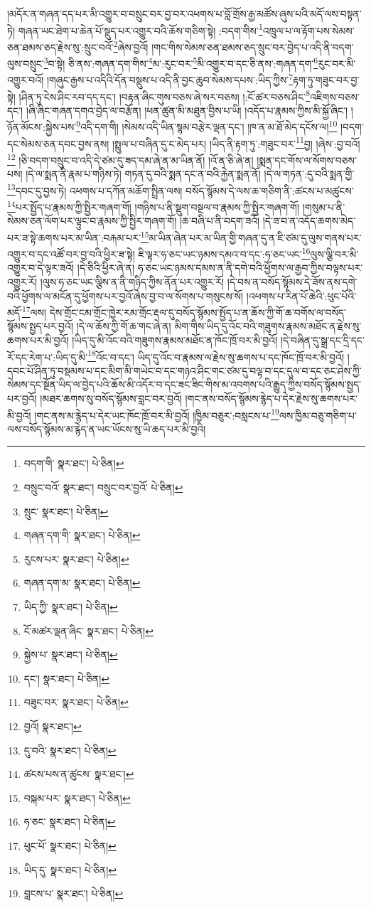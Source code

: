 །མདོར་ན་གཞན་དད་པར་མི་འགྱུར་བ་བསྲུང་བར་བྱ་བར་འཕགས་པ་བློ་གྲོས་རྒྱ་མཚོས་ཞུས་པའི་མདོ་ལས་བསྟན་ཏེ། གཞན་ཡང་ཐེག་པ་ཆེན་པོ་སྡུད་པར་འགྱུར་བའི་ཆོས་གཅིག་སྟེ། :བདག་གིས་\footnote{བདག་གི་  སྣར་ཐང་།  པེ་ཅིན། }འཁྲུལ་པ་ལ་རྟོག་པས་སེམས་ཅན་ཐམས་ཅད་རྗེས་སུ་:སྲུང་བའོ་\footnote{བསྲུང་བའོ་  སྣར་ཐང་། བསྲུང་བར་བྱའོ་  པེ་ཅིན། }ཞེས་བྱའོ། །གང་གིས་སེམས་ཅན་ཐམས་ཅད་སྲུང་བར་བྱེད་པ་འདི་ནི་བདག་ལུས་བསྲུང་\footnote{སྲུང་  སྣར་ཐང་།  པེ་ཅིན། }བ་སྟེ། ཅི་ནས་:གཞན་དག་གིས་\footnote{གཞན་དག་གི་  སྣར་ཐང་།  པེ་ཅིན། }མ་:རུང་བར་\footnote{རུངས་པར་  སྣར་ཐང་།  པེ་ཅིན། }མི་འགྱུར་བ་དང་ཅི་ནས་:གཞན་དག་\footnote{གཞན་དག་མ་  སྣར་ཐང་།  པེ་ཅིན། }རུང་བར་མི་འགྱུར་བའོ། །གཞུང་རྒྱས་པ་འདིའི་དོན་བསྡུས་པ་འདི་ནི་བྱང་ཆུབ་སེམས་དཔས་:ཡིད་ཀྱིས་\footnote{ཡིད་ཀྱི་  སྣར་ཐང་།  པེ་ཅིན། }རྟག་ཏུ་གཟུང་བར་བྱ་སྟེ། །ཤིན་ཏུ་ངེས་ཤིང་རབ་དད་དང་། །བརྟན་ཞིང་གུས་བཅས་ཞེ་སར་བཅས། །:ངོ་ཚར་བཅས་ཤིང་\footnote{ངོ་མཚར་ལྡན་ཞིང་  སྣར་ཐང་།  པེ་ཅིན། }འཇིགས་བཅས་དང་། །ཞི་ཞིང་གཞན་དགའ་བྱེད་ལ་བརྩོན། །ཕན་ཚུན་མི་མཐུན་བྱིས་པ་ཡི། །འདོད་པ་རྣམས་ཀྱིས་མི་སྐྱོ་ཞིང་། །ཉོན་མོངས་:སྐྱེས་པས་\footnote{སྐྱེས་པ་  སྣར་ཐང་།  པེ་ཅིན། }འདི་དག་གི། །སེམས་འདི་ཡིན་སྙམ་བརྩེར་ལྡན་དང་། །ཁ་ན་མ་ཐོ་མེད་དངོས་ལ།\footnote{དང་།  སྣར་ཐང་།  པེ་ཅིན། } །བདག་དང་སེམས་ཅན་དབང་བྱས་ནས། །སྤྲུལ་པ་བཞིན་དུ་ང་མེད་པར། །ཡིད་ནི་རྟག་ཏུ་:གཟུང་བར་\footnote{བཟུང་བར་  སྣར་ཐང་།  པེ་ཅིན། }བྱ། །ཞེས་:བྱ་བའོ།\footnote{བྱའོ།  སྣར་ཐང་། } །ཅི་བདག་བསྲུང་བ་འདི་དེ་ཙམ་དུ་ཟད་དམ་ཞེ་ན་མ་ཡིན་ནོ། །འོ་ན་ཅི་ཞེ་ན། །སྨན་དང་གོས་ལ་སོགས་བཅས་པས། །དེ་ལ་སྨན་ནི་རྣམ་པ་གཉིས་ཏེ། གཏན་དུ་བའི་སྨན་དང་ན་བའི་རྐྱེན་སྨན་ནོ། །དེ་ལ་གཏན་:དུ་བའི་སྨན་གྱི་\footnote{དུ་བའི་  སྣར་ཐང་།  པེ་ཅིན། }དབང་དུ་བྱས་ཏེ། འཕགས་པ་དཀོན་མཆོག་སྤྲིན་ལས། བསོད་སྙོམས་དེ་ལས་ཆ་གཅིག་ནི་:ཚངས་པ་མཚུངས་\footnote{ཚངས་པས་ན་ཚུངས་  སྣར་ཐང་། }པར་སྤྱོད་པ་རྣམས་ཀྱི་སྤྱིར་གཞག་གོ། །གཉིས་པ་ནི་སྡུག་བསྔལ་བ་རྣམས་ཀྱི་སྤྱིར་གཞག་གོ། །གསུམ་པ་ནི་སེམས་ཅན་ལོག་པར་ལྟུང་བ་རྣམས་ཀྱི་སྤྱིར་གཞག་གོ། །ཆ་བཞི་པ་ནི་བདག་ཟའོ། །དེ་ཟ་བ་ན་འདོད་ཆགས་མེད་པར་ཟ་སྟེ་ཆགས་པར་མ་ཡིན་:བརྐམ་པར་\footnote{བསྐམ་པར་  སྣར་ཐང་།  པེ་ཅིན། }མ་ཡིན་ཞེན་པར་མ་ཡིན་གྱི་གཞན་དུ་ན་ཇི་ཙམ་དུ་ལུས་གནས་པར་འགྱུར་བ་དང་འཚོ་བར་བྱ་བའི་ཕྱིར་ཟ་སྟེ། ཇི་ལྟར་ཧ་ཅང་ཡང་ཉམས་དམའ་བ་དང་:ཧ་ཅང་ཡང་\footnote{ཧ་ཅང་  སྣར་ཐང་།  པེ་ཅིན། }ལུས་ལྕི་བར་མི་འགྱུར་བ་དེ་ལྟར་ཟའོ། །དེ་ཅིའི་ཕྱིར་ཞེ་ན། ཧ་ཅང་ཡང་ཉམས་དམས་ན་ནི་དགེ་བའི་ཕྱོགས་ལ་རྒྱབ་ཀྱིས་བལྟས་པར་འགྱུར་རོ། །ལུས་ཧ་ཅང་ཡང་ལྕིས་ན་ནི་གཉིད་ཀྱིས་ནོན་པར་འགྱུར་རོ། །དེ་བས་ན་བསོད་སྙོམས་དེ་ཟོས་ནས་དགེ་བའི་ཕྱོགས་ལ་མངོན་དུ་ཕྱོགས་པར་བྱའོ་ཞེས་བྱ་བ་ལ་སོགས་པ་གསུངས་སོ། །འཕགས་པ་རིན་པོ་ཆེའི་:ཕུང་པོའི་མདོ་\footnote{ཕུང་པོ་  སྣར་ཐང་།  པེ་ཅིན། }ལས། དེས་གྲོང་ངམ་གྲོང་ཁྱེར་རམ་གྲོང་རྡལ་དུ་བསོད་སྙོམས་སྤྱོད་པ་ན་ཆོས་ཀྱི་གོ་ཆ་བགོས་ལ་བསོད་སྙོམས་སྤྱད་པར་བྱའོ། །དེ་ལ་ཆོས་ཀྱི་གོ་ཆ་གང་ཞེ་ན། མིག་གིས་ཡིད་དུ་འོང་བའི་གཟུགས་རྣམས་མཐོང་ན་རྗེས་སུ་ཆགས་པར་མི་བྱའོ། །ཡིད་དུ་མི་འོང་བའི་གཟུགས་རྣམས་མཐོང་ན་ཁོང་ཁྲོ་བར་མི་བྱའོ། །དེ་བཞིན་དུ་སྒྲ་དང་དྲི་དང་རོ་དང་རེག་པ་:ཡིད་དུ་མི་\footnote{ཡིད་དུ་  སྣར་ཐང་།  པེ་ཅིན། }འོང་བ་དང་། ཡིད་དུ་འོང་བ་རྣམས་ལ་རྗེས་སུ་ཆགས་པ་དང་ཁོང་ཁྲོ་བར་མི་བྱའོ། །དབང་པོ་ཤིན་ཏུ་བསྡམས་པ་དང་མིག་མི་གཡེང་བ་དང་གཉའ་ཤིང་གང་ཙམ་དུ་བལྟ་བ་དང་དུལ་བ་དང་ཅང་ཤེས་ཀྱི་སེམས་དང་སྔོན་ཡིད་ལ་བྱེད་པའི་ཆོས་མི་འདོར་བ་དང་ཟང་ཟིང་གིས་མ་འབགས་པའི་རྒྱུད་ཀྱིས་བསོད་སྙོམས་སྤྱད་པར་བྱའོ། །མཐར་ཆགས་སུ་བསོད་སྙོམས་བླང་བར་བྱའོ། །གང་ནས་བསོད་སྙོམས་རྙེད་པ་དེར་རྗེས་སུ་ཆགས་པར་མི་བྱའོ། །གང་ནས་མ་རྙེད་པ་དེར་ཡང་ཁོང་ཁྲོ་བར་མི་བྱའོ། །ཁྱིམ་བཅུར་:བསླངས་པ་\footnote{བླངས་པ་  སྣར་ཐང་།  པེ་ཅིན། }ལས་ཁྱིམ་བཅུ་གཅིག་པ་ལས་བསོད་སྙོམས་མ་རྙེད་ན་ཡང་ཡོངས་སུ་ཡི་ཆད་པར་མི་བྱའི། 